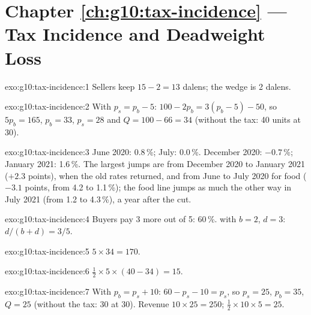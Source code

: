 \section*{Chapter \ref{ch:g10:tax-incidence} --- Tax Incidence and Deadweight Loss}

\begin{solution}{exo:g10:tax-incidence:1}
Sellers keep $15 - 2 = 13$ dalens; the wedge is 2 dalens.
\end{solution}

\begin{solution}{exo:g10:tax-incidence:2}
With $p_s = p_b - 5$: $100 - 2p_b = 3(p_b - 5) - 50$, so $5p_b = 165$, $p_b = 33$, $p_s = 28$ and $Q = 100 - 66 = 34$ (without the tax: 40 units at 30).
\end{solution}

\begin{solution}{exo:g10:tax-incidence:3}
June 2020: 0.8\,\%; July: 0.0\,\%. December 2020: $-0.7$\,\%; January 2021: 1.6\,\%. The largest jumps are from December 2020 to January 2021 ($+2.3$ points), when the old rates returned,
and from June to July 2020 for food ($-3.1$ points, from 4.2 to 1.1\,\%); the food line jumps as much the other way in July 2021
(from 1.2 to 4.3\,\%), a year after the cut.
\end{solution}

\begin{solution}{exo:g10:tax-incidence:4}
Buyers pay 3 more out of 5: 60\,\%.  with $b = 2$, $d = 3$: $d/(b + d) = 3/5$.
\end{solution}

\begin{solution}{exo:g10:tax-incidence:5}
$5 \times 34 = 170$.
\end{solution}

\begin{solution}{exo:g10:tax-incidence:6}
$\tfrac12 \times 5 \times (40 - 34) = 15$.
\end{solution}

\begin{solution}{exo:g10:tax-incidence:7}
With $p_b = p_s + 10$: $60 - p_s - 10 = p_s$, so $p_s = 25$, $p_b = 35$, $Q = 25$ (without the tax: 30 at 30). Revenue $10 \times 25 = 250$;  $\tfrac12 \times 10 \times 5 =
25$.
\end{solution}

